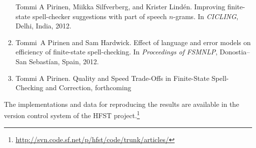\documentclass[officiallayout]{unihelcompling}
\newcommand\misspelt{\bgroup\markoverwith
{\textcolor{red}{\lower3.5pt\hbox{\sixly \char58}}}\ULon}
\begin{document}
\begin{enumerate}
        Tommi A Pirinen, Miikka Silfverberg, and Krister Lindén.
        \newblock Improving finite-state spell-checker suggestions with part of
        speech \(n\)-grams.
        \newblock In {\em CICLING}, Delhi, India, 2012.
    \item[\citetalias{pirinen2012effects}]
        Tommi~A Pirinen and Sam Hardwick.
        \newblock Effect of language and error models on
        efficiency of finite-state spell-checking.
        \newblock In {\em Proceedings of FSMNLP}, Donostia--San Sebastían, Spain, 2012.
    \item[\citetalias{pirinen2013quality}]
        Tommi A Pirinen.
        \newblock Quality and Speed Trade-Offs in
        Finite-State Spell-Checking and Correction, forthcoming
\end{enumerate}

The implementations and data for reproducing the results are available
in the version control system of the HFST
project.\footnote{\url{http://svn.code.sf.net/p/hfst/code/trunk/articles/}}

\tableofcontents

\listoftables

\listoffigures

\listoftodos














\end{document}
